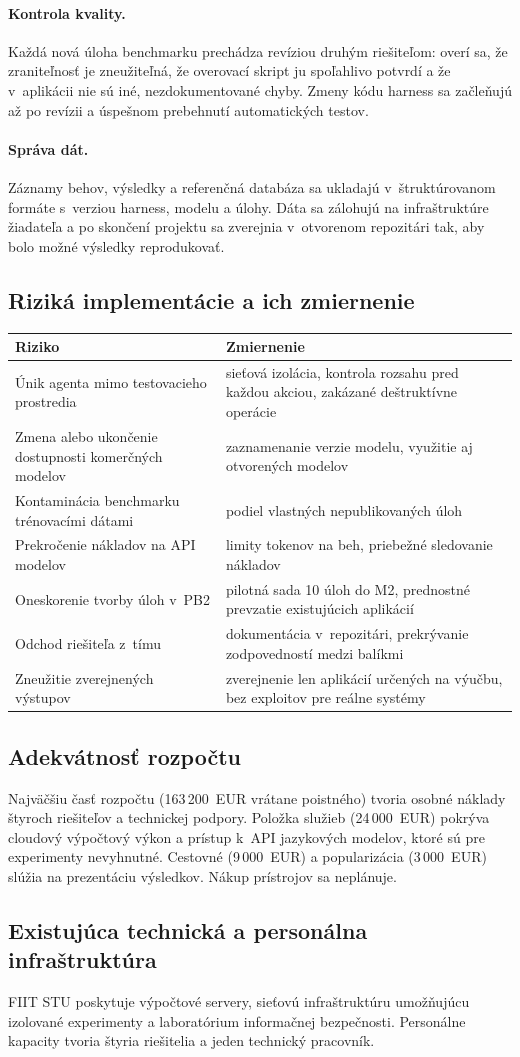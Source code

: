 \documentclass[11pt,a4paper]{article}
\newcommand{\bod}[1]{\subsection*{#1}}
\begin{document}
\paragraph{Kontrola kvality.} Každá nová úloha benchmarku prechádza revíziou druhým riešiteľom: overí sa, že zraniteľnosť je zneužiteľná, že overovací skript ju spoľahlivo potvrdí a že v~aplikácii nie sú iné, nezdokumentované chyby. Zmeny kódu harness sa začleňujú až po revízii a úspešnom prebehnutí automatických testov.

\paragraph{Správa dát.} Záznamy behov, výsledky a referenčná databáza sa ukladajú v~štruktúrovanom formáte s~verziou harness, modelu a úlohy. Dáta sa zálohujú na infraštruktúre žiadateľa a po skončení projektu sa zverejnia v~otvorenom repozitári tak, aby bolo možné výsledky reprodukovať.

\bod{Riziká implementácie a ich zmiernenie}
\noindent
\begin{tabularx}{\textwidth}{@{}XX@{}}
\toprule
\textbf{Riziko} & \textbf{Zmiernenie} \\ \midrule
Únik agenta mimo testovacieho prostredia & sieťová izolácia, kontrola rozsahu pred každou akciou, zakázané deštruktívne operácie \\
Zmena alebo ukončenie dostupnosti komerčných modelov & zaznamenanie verzie modelu, využitie aj otvorených modelov \\
Kontaminácia benchmarku trénovacími dátami & podiel vlastných nepublikovaných úloh \\
Prekročenie nákladov na API modelov & limity tokenov na beh, priebežné sledovanie nákladov \\
Oneskorenie tvorby úloh v~PB2 & pilotná sada 10 úloh do M2, prednostné prevzatie existujúcich aplikácií \\
Odchod riešiteľa z~tímu & dokumentácia v~repozitári, prekrývanie zodpovedností medzi balíkmi \\
Zneužitie zverejnených výstupov & zverejnenie len aplikácií určených na výučbu, bez exploitov pre reálne systémy \\ \bottomrule
\end{tabularx}

\bod{Adekvátnosť rozpočtu}
Najväčšiu časť rozpočtu (163\,200~EUR vrátane poistného) tvoria osobné náklady štyroch riešiteľov a technickej podpory. Položka služieb (24\,000~EUR) pokrýva cloudový výpočtový výkon a prístup k~API jazykových modelov, ktoré sú pre experimenty nevyhnutné. Cestovné (9\,000~EUR) a popularizácia (3\,000~EUR) slúžia na prezentáciu výsledkov. Nákup prístrojov sa neplánuje.

\bod{Existujúca technická a personálna infraštruktúra}
FIIT STU poskytuje výpočtové servery, sieťovú infraštruktúru umožňujúcu izolované experimenty a laboratórium informačnej bezpečnosti. Personálne kapacity tvoria štyria riešitelia a jeden technický pracovník.



\end{document}
